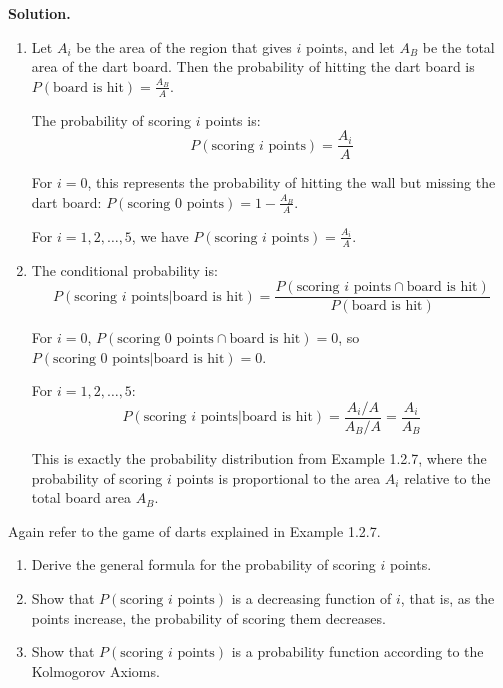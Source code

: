 \noindent\textbf{Solution.}
\begin{enumerate}[label=(\alph*)]
    \item Let $A_i$ be the area of the region that gives $i$ points, and let $A_B$ be the total area of the dart board. Then the probability of hitting the dart board is $P(\text{board is hit}) = \frac{A_B}{A}$.
    
    The probability of scoring $i$ points is:
    \[ P(\text{scoring } i \text{ points}) = \frac{A_i}{A} \]
    
    For $i = 0$, this represents the probability of hitting the wall but missing the dart board: $P(\text{scoring } 0 \text{ points}) = 1 - \frac{A_B}{A}$.
    
    For $i = 1, 2, \ldots, 5$, we have $P(\text{scoring } i \text{ points}) = \frac{A_i}{A}$.
    
    \item The conditional probability is:
    \[ P(\text{scoring } i \text{ points}|\text{board is hit}) = \frac{P(\text{scoring } i \text{ points} \cap \text{board is hit})}{P(\text{board is hit})} \]
    
    For $i = 0$, $P(\text{scoring } 0 \text{ points} \cap \text{board is hit}) = 0$, so $P(\text{scoring } 0 \text{ points}|\text{board is hit}) = 0$.
    
    For $i = 1, 2, \ldots, 5$:
    \[ P(\text{scoring } i \text{ points}|\text{board is hit}) = \frac{A_i/A}{A_B/A} = \frac{A_i}{A_B} \]
    
    This is exactly the probability distribution from Example 1.2.7, where the probability of scoring $i$ points is proportional to the area $A_i$ relative to the total board area $A_B$.
\end{enumerate}


\begin{problembox}
Again refer to the game of darts explained in Example 1.2.7.
\begin{enumerate}[label=(\alph*)]
    \item Derive the general formula for the probability of scoring $i$ points.
    \item Show that $P(\text{scoring } i \text{ points})$ is a decreasing function of $i$, that is, as the points increase, the probability of scoring them decreases.
    \item Show that $P(\text{scoring } i \text{ points})$ is a probability function according to the Kolmogorov Axioms.
\end{enumerate}
\end{problembox}

